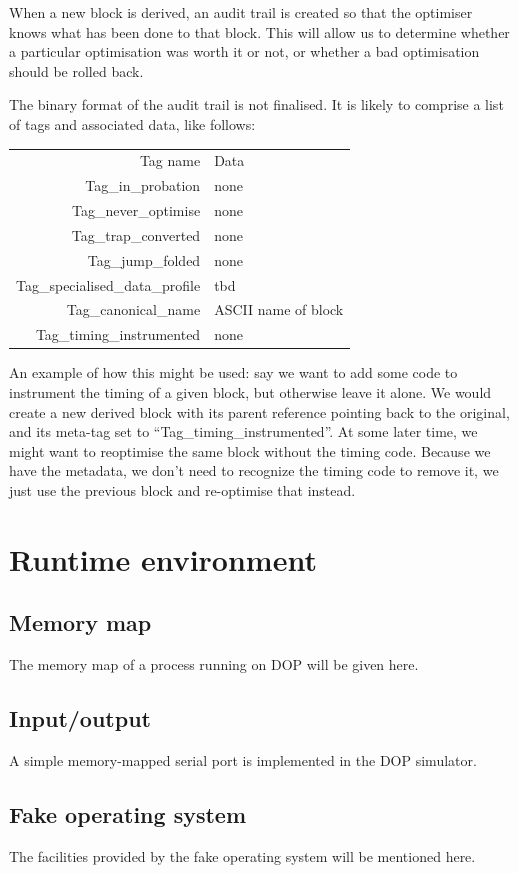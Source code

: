 When a new block is derived, an audit trail is created so that the optimiser knows what has been done to that block. This will allow us to determine whether a particular optimisation was worth it or not, or whether a bad optimisation should be rolled back.

The binary format of the audit trail is not finalised. It is likely to comprise a list of tags and associated data, like follows:

\begin{tabular}[t]{rl}
Tag name & Data \\[0.5ex]
Tag\_in\_probation & none \\
Tag\_never\_optimise & none \\
Tag\_trap\_converted & none \\
Tag\_jump\_folded & none \\
Tag\_specialised\_data\_profile & tbd \\
Tag\_canonical\_name & ASCII name of block \\
Tag\_timing\_instrumented & none
\end{tabular}

An example of how this might be used: say we want to add some code to instrument the timing of a given block, but otherwise leave it alone. We would create a new derived block with its parent reference pointing back to the original, and its meta-tag set to ``Tag\_timing\_instrumented''. At some later time, we might want to reoptimise the same block without the timing code. Because we have the metadata, we don't need to recognize the timing code to remove it, we just use the previous block and re-optimise that instead.

\section{Runtime environment}

\subsection{Memory map}

The memory map of a process running on DOP will be given here.

\subsection{Input/output}

A simple memory-mapped serial port is implemented in the DOP simulator.

\subsection{Fake operating system}

The facilities provided by the fake operating system will be mentioned here.
